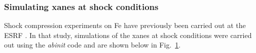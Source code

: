 \subsubsection{Simulating \gls{xanes} at shock conditions}
Shock compression experiments on Fe have previously been carried out at the ESRF
\cite{Torchio2016}. In that study,
simulations of the \gls{xanes} at shock conditions were carried out using the
\textit{abinit} code and are shown below in Fig.~\ref{fig:xafs_fig4}.
%
\begin{figure}
  \label{fig:xafs_fig4}
\end{figure}
